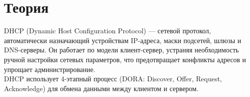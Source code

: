 \chapter{Теория}

DHCP (Dynamic Host Configuration Protocol) — сетевой протокол, автоматически назначающий устройствам IP-адреса, маски подсетей, 
шлюзы и DNS-серверы. Он работает по модели клиент-сервер, устраняя необходимость ручной настройки сетевых параметров, 
что предотвращает конфликты адресов и упрощает администрирование. \\

DHCP использует 4-этапный процесс (DORA: Discover, Offer, Request, Acknowledge) для обмена данными между клиентом и сервером.
\endinput